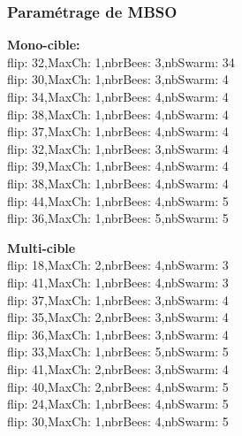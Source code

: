 \subsubsection{Paramétrage de MBSO}
\noindent
\begin{minipage}[t]{0.55\textwidth}
	\textbf{Mono-cible:} \\
flip: 32,MaxCh: 1,nbrBees: 3,nbSwarm: 34\\
flip: 30,MaxCh: 1,nbrBees: 3,nbSwarm: 4\\
flip: 34,MaxCh: 1,nbrBees: 4,nbSwarm: 4\\
flip: 38,MaxCh: 1,nbrBees: 4,nbSwarm: 4\\
flip: 37,MaxCh: 1,nbrBees: 4,nbSwarm: 4\\
flip: 32,MaxCh: 1,nbrBees: 3,nbSwarm: 4\\
flip: 39,MaxCh: 1,nbrBees: 4,nbSwarm: 4\\
flip: 38,MaxCh: 1,nbrBees: 4,nbSwarm: 4\\
flip: 44,MaxCh: 1,nbrBees: 4,nbSwarm: 5\\
flip: 36,MaxCh: 1,nbrBees: 5,nbSwarm: 5
	
\end{minipage}\hfill
\hspace{0.2cm}
\begin{minipage}[t]{0.55\textwidth}
	\textbf{Multi-cible}\\
flip: 18,MaxCh: 2,nbrBees: 4,nbSwarm: 3\\
flip: 41,MaxCh: 1,nbrBees: 4,nbSwarm: 3\\
flip: 37,MaxCh: 1,nbrBees: 3,nbSwarm: 4\\
flip: 35,MaxCh: 2,nbrBees: 3,nbSwarm: 4\\
flip: 36,MaxCh: 1,nbrBees: 3,nbSwarm: 4\\
flip: 33,MaxCh: 1,nbrBees: 5,nbSwarm: 5\\
flip: 41,MaxCh: 2,nbrBees: 3,nbSwarm: 4\\
flip: 40,MaxCh: 2,nbrBees: 4,nbSwarm: 5\\
flip: 24,MaxCh: 1,nbrBees: 4,nbSwarm: 5\\
flip: 30,MaxCh: 1,nbrBees: 4,nbSwarm: 5

\end{minipage}\hfill



